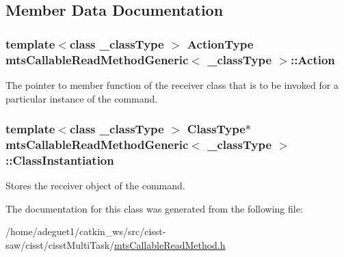 \subsection{Member Data Documentation}
\hypertarget{classmts_callable_read_method_generic_a68e6410f6fc38a56009ac9c6bab0ac68}{
\subsubsection[{Action}]{\setlength{\rightskip}{0pt plus 5cm}template$<$class \-\_\-class\-Type $>$ {\bf Action\-Type} {\bf mts\-Callable\-Read\-Method\-Generic}$<$ \-\_\-class\-Type $>$\-::Action\hspace{0.3cm}{\ttfamily [protected]}}}\label{classmts_callable_read_method_generic_a68e6410f6fc38a56009ac9c6bab0ac68}
The pointer to member function of the receiver class that is to be invoked for a particular instance of the command. \hypertarget{classmts_callable_read_method_generic_a78aa69ee0ab2f0c1120a4320c1315507}{
\subsubsection[{Class\-Instantiation}]{\setlength{\rightskip}{0pt plus 5cm}template$<$class \-\_\-class\-Type $>$ {\bf Class\-Type}$\ast$ {\bf mts\-Callable\-Read\-Method\-Generic}$<$ \-\_\-class\-Type $>$\-::Class\-Instantiation\hspace{0.3cm}{\ttfamily [protected]}}}\label{classmts_callable_read_method_generic_a78aa69ee0ab2f0c1120a4320c1315507}
Stores the receiver object of the command. 

The documentation for this class was generated from the following file\-:\begin{DoxyCompactItemize}
\item 
/home/adeguet1/catkin\-\_\-ws/src/cisst-\/saw/cisst/cisst\-Multi\-Task/\hyperlink{mts_callable_read_method_8h}{mts\-Callable\-Read\-Method.\-h}\end{DoxyCompactItemize}
